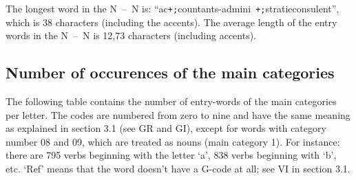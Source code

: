 The longest word in the N~--~N is: ``ac{\tt +;}countants-admini{\tt
+;}stratieconsulent'', which is 38 characters (including the accents). The
average length of the entry words in the N~--~N is 12,73 characters (including
accents). 

\subsection{Number of occurences of the main categories}
 The following table contains the number of entry-words of the main categories
 per letter. The codes are 
 numbered from zero to nine and have the same meaning as explained in section 
 3.1 (see GR and GI), except for words with category number 08 and 09, which
 are treated as nouns (main category 1). 
 For instance: there are 795 verbs beginning with the 
 letter `a', 838 verbs beginning with `b', etc.
 `Ref' means that the word doesn't have a G-code at all; see VI in 
 section 3.1. 

